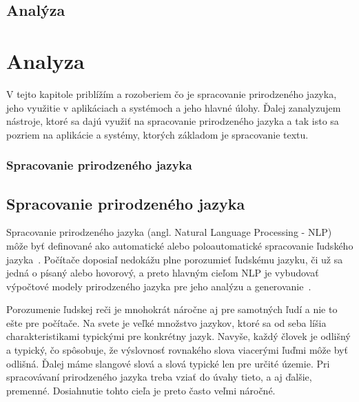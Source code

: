 \newpage
%
%
{
	\section{Analýza} 
}
{
	\chapter{Analyza}
}
V tejto kapitole priblížím a rozoberiem čo je spracovanie prirodzeného jazyka, jeho využitie v aplikáciach a systémoch a jeho hlavné úlohy. Ďalej zanalyzujem nástroje, ktoré sa dajú využiť na spracovanie prirodzeného jazyka a tak isto sa pozriem na aplikácie a systémy, ktorých základom je spracovanie textu.

%
%
{
	\subsection{Spracovanie prirodzeného jazyka}
}
{
	\section{Spracovanie prirodzeného jazyka}
}
\label{subsec:nlp}
Spracovanie prirodzeného jazyka (angl. Natural Language Processing - NLP) môže byť definované ako automatické alebo poloautomatické spracovanie ľudského jazyka~\cite{Copestake2004}. Počítače doposiaľ nedokážu plne porozumieť ľudskému jazyku, či už sa jedná o písaný alebo hovorový, a preto hlavným cieľom NLP je vybudovať výpočtové modely prirodzeného jazyka pre jeho analýzu a generovanie~\cite{Bharati1995}.

Porozumenie ľudskej reči je mnohokrát náročne aj pre samotných ľudí a nie to ešte pre počítače. Na svete je veľké množstvo jazykov, ktoré sa od seba líšia charakteristikami typickými pre konkrétny jazyk. Navyše, každý človek je odlišný a typický, čo spôsobuje, že výslovnosť rovnakého slova viacerými ľuďmi môže byť odlišná. Ďalej máme slangové slová a slová typické len pre určité územie. Pri spracovávaní prirodzeného jazyka treba vziať do úvahy tieto, a aj ďalšie, premenné. Dosiahnutie tohto cieľa je preto často veľmi náročné.

